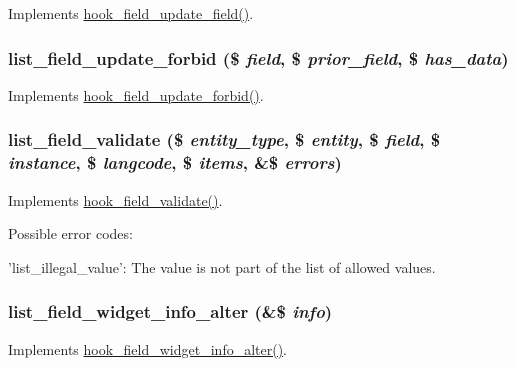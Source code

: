 \label{list_8module_affec6e81ffd24248ec77ad48fb659e78}
Implements \hyperlink{group__field__crud_ga4f06c14e6fb60ec1903c005ddbb4ee83}{hook\_\-field\_\-update\_\-field()}. \hypertarget{list_8module_a358175e4b86e8774e0c60d827bbe8367}{
\subsubsection[{list\_\-field\_\-update\_\-forbid}]{\setlength{\rightskip}{0pt plus 5cm}list\_\-field\_\-update\_\-forbid (\$ {\em field}, \/  \$ {\em prior\_\-field}, \/  \$ {\em has\_\-data})}}
\label{list_8module_a358175e4b86e8774e0c60d827bbe8367}
Implements \hyperlink{group__field__crud_ga7bd0ccd40a9a3690b697b68d03f660a4}{hook\_\-field\_\-update\_\-forbid()}. \hypertarget{list_8module_accbb5465b471c4b4e888dd703f34fc45}{
\subsubsection[{list\_\-field\_\-validate}]{\setlength{\rightskip}{0pt plus 5cm}list\_\-field\_\-validate (\$ {\em entity\_\-type}, \/  \$ {\em entity}, \/  \$ {\em field}, \/  \$ {\em instance}, \/  \$ {\em langcode}, \/  \$ {\em items}, \/  \&\$ {\em errors})}}
\label{list_8module_accbb5465b471c4b4e888dd703f34fc45}
Implements \hyperlink{group__field__types_gaa7d8846e8fe3766e1b3435cd50b965be}{hook\_\-field\_\-validate()}.

Possible error codes:
\begin{DoxyItemize}
\item 'list\_\-illegal\_\-value': The value is not part of the list of allowed values. 
\end{DoxyItemize}\hypertarget{list_8module_a083f26acdff7696710aefa11970801bd}{
\subsubsection[{list\_\-field\_\-widget\_\-info\_\-alter}]{\setlength{\rightskip}{0pt plus 5cm}list\_\-field\_\-widget\_\-info\_\-alter (\&\$ {\em info})}}
\label{list_8module_a083f26acdff7696710aefa11970801bd}
Implements \hyperlink{group__field__widget_ga2e74ac1b4b45e9f31b58b86d01892e7e}{hook\_\-field\_\-widget\_\-info\_\-alter()}.

